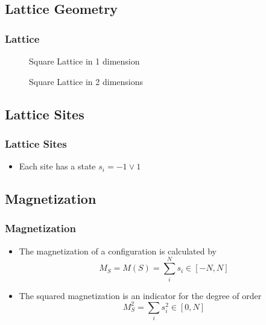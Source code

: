 \documentclass{beamer}
\newcommand{\tikzfigC}[2]{\begin{figure}[h]\begin{center}\end{center}\caption{{#2}}\end{figure}}
\begin{document}
\subsection{Lattice Geometry}
\begin{frame}\frametitle{Lattice}
\tikzfigC{Ising1D}{Square Lattice in 1 dimension}
\vspace*{0.25cm}
\tikzfigC{Ising2D}{Square Lattice in 2 dimensions}
\end{frame}

\subsection{Lattice Sites}
\begin{frame}\frametitle{Lattice Sites}
\begin{itemize}
\item Each site has a state $s_i = -1\lor1$
\end{itemize}
\end{frame}





\subsection{Magnetization}
\begin{frame}\frametitle{Magnetization}
\begin{itemize}
\item The magnetization of a configuration is calculated by \[M_S = M(S) = \sum_i^N s_i \in[-N,N]\]
\item The squared magnetization is an indicator for the degree of order \[M_S^2 = \sum_i s_i^2 \in[0,N]\]
\end{itemize}
\end{frame}
\end{document}
